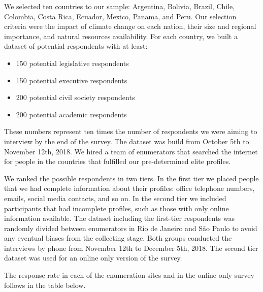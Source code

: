 \documentclass[12pt,a4paper,]{article}
\providecommand{\tightlist}{%
   \setlength{\itemsep}{0pt}\setlength{\parskip}{0pt}}
\begin{document}
We selected ten countries to our sample: Argentina, Bolivia, Brazil,
Chile, Colombia, Costa Rica, Ecuador, Mexico, Panama, and Peru. Our
selection criteria were the impact of climate change on each nation,
their size and regional importance, and natural resources availability.
For each country, we built a dataset of potential respondents with at
least:

\begin{itemize}
\tightlist
\item
  150 potential legislative respondents
\item
  150 potential executive respondents
\item
  200 potential civil society respondents
\item
  200 potential academic respondents
\end{itemize}

These numbers represent ten times the number of respondents we were
aiming to interview by the end of the survey. The dataset was build from
October 5th to November 12th, 2018. We hired a team of enumerators that
searched the internet for people in the countries that fulfilled our
pre-determined elite profiles.

We ranked the possible respondents in two tiers. In the first tier we
placed people that we had complete information about their profiles:
office telephone numbers, emails, social media contacts, and so on. In
the second tier we included participants that had incomplete profiles,
such as those with only online information available. The dataset
including the first-tier respondents was randomly divided between
enumerators in Rio de Janeiro and São Paulo to avoid any eventual biases
from the collecting stage. Both groups conducted the interviews by phone
from November 12th to December 5th, 2018. The second tier dataset was
used for an online only version of the survey.

The response rate in each of the enumeration sites and in the online
only survey follows in the table below.

\vspace{.5cm}
\end{document}
